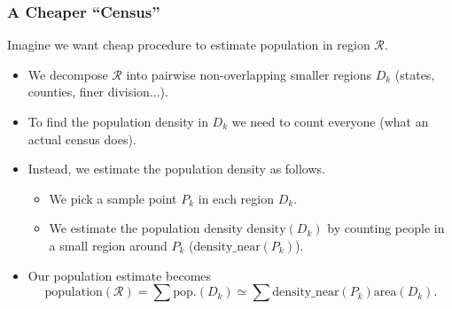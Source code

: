 \begin{frame}
\frametitle{A Cheaper ``Census''}
Imagine we want cheap procedure to estimate population in region $\mathcal{R}$.
\begin{itemize}
\item<2-> We decompose $\mathcal{R}$ into pairwise non-overlapping smaller regions $D_k$ (states, counties, finer division...).
\item<4-> To find the population density in $D_k$ we need to count everyone (what an actual census does).
\item<5-> Instead, we estimate the population density as follows.
\begin{itemize}
\item<6-> We pick a sample point $P_k$ in each region $D_k$.
\item<7-> We estimate the population density $\text{density}(D_k)$ by counting people in a small region around $P_k$ ($\text{density\_near}(P_k)$).
\end{itemize}
\item<8-> Our population estimate becomes
\[
\text{population}(\mathcal{R}) = \sum \text{pop.}(D_k) \simeq \sum \text{density\_near}(P_k) \text{area}(D_k).
\]
\end{itemize}
\end{frame}